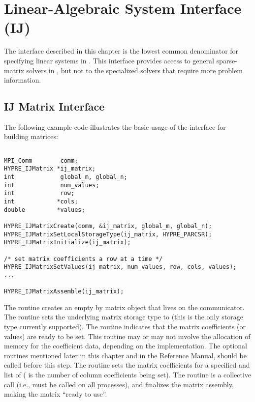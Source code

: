 \chapter{Linear-Algebraic System Interface (IJ)}
\label{Linear-Algebraic System Interface}

The  interface described in this chapter is the lowest common
denominator for specifying linear systems in \hypre{}.  This interface
provides access to general sparse-matrix solvers in \hypre{}, but not
to the specialized solvers that require more problem information.


\section{IJ Matrix Interface}

The following example code illustrates the basic usage of the
 interface for building matrices:
\begin{display}
\begin{verbatim}

MPI_Comm        comm;
HYPRE_IJMatrix *ij_matrix;
int             global_m, global_n;
int             num_values;
int             row;
int            *cols;
double         *values;

HYPRE_IJMatrixCreate(comm, &ij_matrix, global_m, global_n);
HYPRE_IJMatrixSetLocalStorageType(ij_matrix, HYPRE_PARCSR);
HYPRE_IJMatrixInitialize(ij_matrix);

/* set matrix coefficients a row at a time */
HYPRE_IJMatrixSetValues(ij_matrix, num_values, row, cols, values);
...

HYPRE_IJMatrixAssemble(ij_matrix);

\end{verbatim}
\end{display}
The  routine creates an empty  by
 matrix object that lives on the  communicator.
The  routine sets the underlying matrix
storage type to  (this is the only storage type
currently supported).  The  routine indicates that
the matrix coefficients (or values) are ready to be set.  This routine
may or may not involve the allocation of memory for the coefficient
data, depending on the implementation.  The optional 
routines mentioned later in this chapter and in the Reference Manual,
should be called before this step.  The  routine
sets the matrix coefficients for a specified  and list of
 ( is the number of column coefficients being set).
The  routine is a collective call (i.e., must be
called on all processes), and finalizes the matrix assembly, making
the matrix ``ready to use''.

